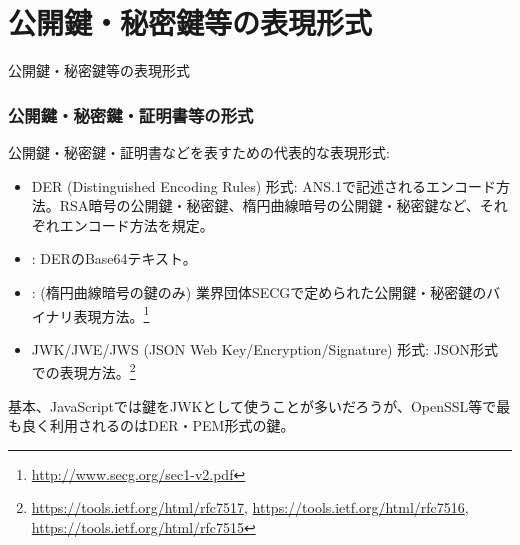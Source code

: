 \documentclass[12pt,dvipdfmx]{beamer}
\begin{document}
\section{公開鍵・秘密鍵等の表現形式}
\begin{frame}
\centering
{\Large 公開鍵・秘密鍵等の表現形式}
\end{frame}

\begin{frame}
\frametitle{公開鍵・秘密鍵・証明書等の形式}
公開鍵・秘密鍵・証明書などを表すための代表的な表現形式:
\begin{itemize}
 \item DER (Distinguished Encoding Rules) 形式: ANS.1で記述されるエンコード方法。RSA暗号の公開鍵・秘密鍵、楕円曲線暗号の公開鍵・秘密鍵など、それぞれエンコード方法を規定。
 \item {}: DERのBase64テキスト。
 \item {}: (楕円曲線暗号の鍵のみ) 業界団体SECGで定められた公開鍵・秘密鍵のバイナリ表現方法。\footnote[frame]{\scriptsize \url{http://www.secg.org/sec1-v2.pdf}}
 \item JWK/JWE/JWS (JSON Web Key/Encryption/Signature) 形式: JSON形式での表現方法。\footnote[frame]{\scriptsize \url{https://tools.ietf.org/html/rfc7517}, \url{https://tools.ietf.org/html/rfc7516}, \url{https://tools.ietf.org/html/rfc7515}}
\end{itemize}
基本、JavaScriptでは鍵をJWKとして使うことが多いだろうが、OpenSSL等で最も良く利用されるのはDER・PEM形式の鍵。
\end{frame}
\end{document}
